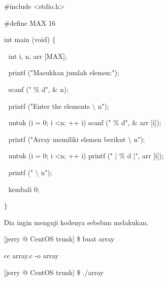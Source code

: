 \noindent 
 \hspace*{0.5in}  $  \#  $include <stdio.h> \par
\noindent 
 \hspace*{0.5in}  $  \#  $define MAX 16 \par
\noindent 
 \hspace*{0.5in} int main (void)  $  \{  $ \par
\noindent 
 \hspace*{0.5in}  $  $ $  $ $  $int i, n, arr [MAX]; \par
\noindent 
 \hspace*{0.5in}  $  $ $  $ $  $printf ("Masukkan jumlah elemen:"); \par
\noindent 
 \hspace*{0.5in}  $  $ $  $ $  $scanf (" $  \%  $ d",  $  \&  $ n); \par
\noindent 
 \hspace*{0.5in}  $  $ $  $ $  $printf ("Enter the elements  $  \setminus  $ n"); \par
\noindent 
 \hspace*{0.5in}  $  $ $  $ $  $untuk (i = 0; i <n; ++ i) scanf (" $  \%  $ d",  $  \&  $ arr [i]); \par
\noindent 
 \hspace*{0.5in}  $  $ $  $ $  $printf ("Array memiliki elemen berikut  $  \setminus  $ n"); \par
\noindent 
 \hspace*{0.5in}  $  $ $  $ $  $untuk (i = 0; i <n; ++ i) printf (" $  \vert  $ $  \%  $ d  $  \vert  $", arr [i]); \par
\noindent 
 \hspace*{0.5in}  $  $ $  $ $  $printf (" $  \setminus  $ n"); \par
\noindent 
 \hspace*{0.5in}  $  $ $  $ $  $kembali 0; \par
\noindent 
 \hspace*{0.5in}  $  \}  $ \par
 \vspace{\baselineskip}
\noindent 
Dia ingin menguji kodenya sebelum melakukan. \par
\noindent 
 \hspace*{0.5in} [jerry @ CentOS trunk]  $  \$  $ buat array \par
\noindent 
 \hspace*{0.5in} cc array.c -o array \par
\noindent 
 \hspace*{0.5in} [jerry @ CentOS trunk]  $  \$  $ ./array \par
